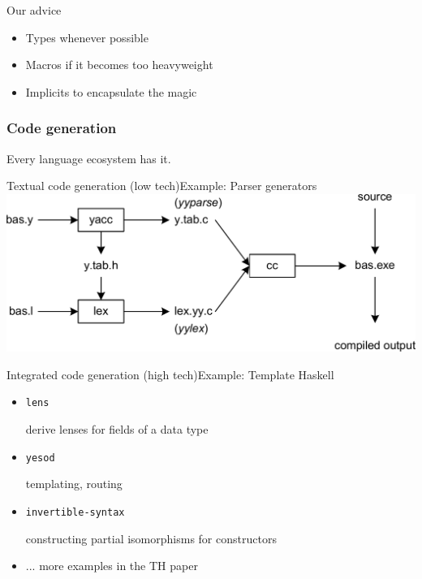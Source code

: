 \documentclass{beamer}
\begin{document}
\begin{frame}{Our advice}
  \begin{itemize}
  \item Types whenever possible
  \item Macros if it becomes too heavyweight
  \item Implicits to encapsulate the magic
  \end{itemize}
\end{frame}

\begin{frame}
\vskip40pt
\begin{center}
\end{center}
\end{frame}

\begin{frame}[fragile]
\frametitle{Code generation}
  Every language ecosystem has it.
\end{frame}

\begin{frame}[fragile]{Textual code generation (low tech)}{Example: Parser generators}
  \includegraphics[width=\linewidth]{img/yacc.png}
\end{frame}

\begin{frame}{Integrated code generation (high tech)}{Example: Template Haskell}
  \begin{itemize}
    \item \texttt{lens}

       derive lenses for fields of a data type
    \item \texttt{yesod}

      templating, routing
    \item \texttt{invertible-syntax}

      constructing partial isomorphisms for constructors

    \item ... more examples in the TH paper
  \end{itemize}
\end{frame}
\end{document}
